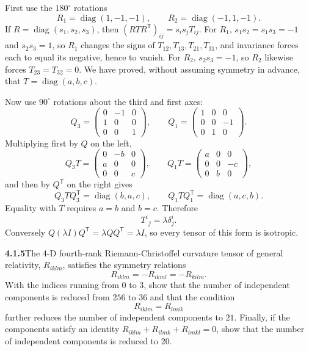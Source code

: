 First use the $180^\circ$ rotations
\[
R_1=\operatorname{diag}(1,-1,-1),\qquad
R_2=\operatorname{diag}(-1,1,-1).
\]
If $R=\operatorname{diag}(s_1,s_2,s_3)$, then
$(RTR^{\mathsf T})_{ij}=s_i s_jT_{ij}$. For $R_1$,
$s_1s_2=s_1s_3=-1$ and $s_2s_3=1$, so $R_1$ changes the signs of
$T_{12},T_{13},T_{21},T_{31}$, and invariance forces each to equal its
negative, hence to vanish. For $R_2$, $s_2s_3=-1$, so $R_2$ likewise
forces $T_{23}=T_{32}=0$.
We have proved, without assuming symmetry in advance, that
$T=\operatorname{diag}(a,b,c)$.

Now use $90^\circ$ rotations about the third and first axes:
\[
Q_3=\begin{pmatrix}0&-1&0\\1&0&0\\0&0&1\end{pmatrix},\qquad
Q_1=\begin{pmatrix}1&0&0\\0&0&-1\\0&1&0\end{pmatrix}.
\]
Multiplying first by $Q$ on the left,
\[
Q_3T=\begin{pmatrix}0&-b&0\\a&0&0\\0&0&c\end{pmatrix},\qquad
Q_1T=\begin{pmatrix}a&0&0\\0&0&-c\\0&b&0\end{pmatrix},
\]
and then by $Q^{\mathsf T}$ on the right gives
\[
Q_3TQ_3^{\mathsf T}=\operatorname{diag}(b,a,c),\qquad
Q_1TQ_1^{\mathsf T}=\operatorname{diag}(a,c,b).
\]
Equality with $T$ requires $a=b$ and $b=c$. Therefore
\[
\boxed{T^i{}_j=\lambda\delta^i_j}.
\]
Conversely $Q(\lambda I)Q^{\mathsf T}=\lambda QQ^{\mathsf T}=\lambda I$,
so every tensor of this form is isotropic.

\par\bigskip
\noindent\textbf{4.1.5}\quad The 4-D fourth-rank Riemann-Christoffel curvature
tensor of general relativity, $R_{iklm}$, satisfies the symmetry relations
\[
R_{iklm}=-R_{ikml}=-R_{kilm}.
\]
With the indices running from $0$ to $3$, show that the number of independent
components is reduced from $256$ to $36$ and that the condition
\[
R_{iklm}=R_{lmik}
\]
further reduces the number of independent components to $21$. Finally, if the
components satisfy an identity $R_{iklm}+R_{ilmk}+R_{imkl}=0$, show that the
number of independent components is reduced to $20$.


